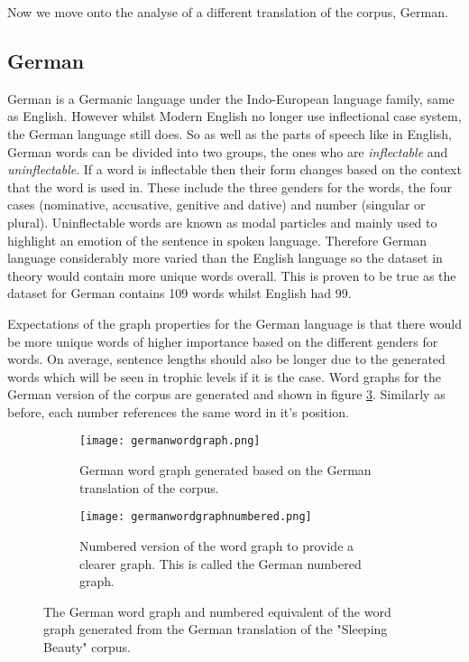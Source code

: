 Now we move onto the analyse of a different translation of the corpus, German.

\subsection{German}
German is a Germanic language under the Indo-European language family, same as English. However whilst Modern English no longer use inflectional case system, the German language still does\cite{durrell2011hammer}. So as well as the parts of speech like in English, German words can be divided into two groups, the ones who are \emph{inflectable} and \emph{uninflectable}. If a word is inflectable then their form changes based on the context that the word is used in. These include the three genders for the words, the four cases (nominative, accusative, genitive and dative) and number (singular or plural). Uninflectable words are known as modal particles and mainly used to highlight an emotion of the sentence in spoken language. Therefore German language considerably more varied than the English language so the dataset in theory would contain more unique words overall. This is proven to be true as the dataset for German contains 109 words whilst English had 99.

Expectations of the graph properties for the German language is that there would be more unique words of higher importance based on the different genders for words. On average, sentence lengths should also be longer due to the generated words which will be seen in trophic levels if it is the case. Word graphs for the German version of the corpus are generated and shown in figure \ref{fig:gergraph}. Similarly as before, each number references the same word in it's position.

\begin{figure}[H]
\centering
\begin{subfigure}{.45\textwidth}
	\texttt{[image: germanwordgraph.png]}
	\caption{German word graph generated based on the German translation of the corpus.}
	\label{fig:gerword}
\end{subfigure}
\hfill
\begin{subfigure}{.45\textwidth}
	\hspace{-2cm} 
	\texttt{[image: germanwordgraphnumbered.png]}
	\caption{Numbered version of the word graph to provide a clearer graph. This is called the German numbered graph.}
	\label{fig:gernum}
\end{subfigure}
\caption{The German word graph and numbered equivalent of the word graph generated from the German translation of the "Sleeping Beauty" corpus.}
\label{fig:gergraph}
\end{figure}

